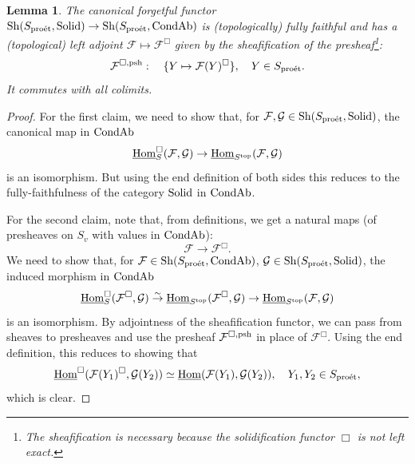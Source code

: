 \documentclass[10pt]{amsart}
\newtheorem{lemma}[equation]{Lemma}
\theoremstyle{definition}
\theoremstyle{remark}
\newcommand{\proeet}{\operatorname{pro\acute{e}t} }
\newcommand{\uHom}{\underline{{\rm{Hom}} }}
\newcommand{\sff}{{\mathcal{F}}}
\newcommand{\sg}{{\mathcal{G}}}
\numberwithin{equation}{section}
\numberwithin{equation}{section}
\begin{document}
\begin{lemma}\label{solidification1}
 The canonical forgetful functor ${\rm Sh}(S_{\proeet},{\rm Solid})\to {\rm Sh}(S_{\proeet},{\rm CondAb})$ is (topologically)  fully faithful and has a (topological) left adjoint $\sff\mapsto \sff^{\Box}$ given by the sheafification of the presheaf\footnote{The sheafification is necessary because the solidification functor $\Box$ is not left exact.}:
 $$
{\sff}^{\Box,{\rm psh}}:\quad  \{Y\mapsto \sff(Y)^{\Box}\},\quad Y\in S_{\proeet}.
 $$
 It commutes with all colimits. 
 \end{lemma}
 \begin{proof}For the first claim, we need to show that, for $\sff, \sg \in {\rm Sh}(S_{\proeet},{\rm Solid})$,  the canonical map in ${\rm CondAb}$
 $$
 \uHom^{\Box}_{S}(\sff,\sg)\to  \uHom_{S^{\rm top}}(\sff,\sg)
 $$
 is an isomorphism. But using the end definition of both sides this reduces to the fully-faithfulness of the category ${\rm Solid}$ in ${\rm CondAb}$.
 
    For the second claim, note that,  from definitions, we get a natural maps (of presheaves on $S_v$ with values in ${\rm CondAb}$):
 $$
 \sff\to \sff^{\Box}. 
 $$
 We need to show that, for $\sff\in {\rm Sh}(S_{\proeet},{\rm CondAb})$,
$\sg \in {\rm Sh}(S_{\proeet},{\rm Solid})$, the induced morphism in ${\rm CondAb}$
 $$
\uHom^{\Box}_{S}(\sff^{\Box},\sg)\stackrel{\sim}{\to}  \uHom_{S^{\rm top}}(\sff^{\Box},\sg) \to \uHom_{S^{\rm top}}(\sff,\sg) 
 $$
 is an isomorphism. 
 By adjointness of the sheafification functor, we can pass from sheaves to presheaves and  use the presheaf ${\sff}^{\Box,{\rm psh}}$ in place of $\sff^{\Box}$. Using the end definition, this reduces to showing that
 $$
  \uHom^{\Box}({\sff}(Y_1)^{\Box},\sg(Y_2))\simeq \uHom(\sff(Y_1),\sg(Y_2)),\quad Y_1, Y_2\in S_{\proeet},
 $$
 which is clear. 
  \end{proof}
\end{document}
